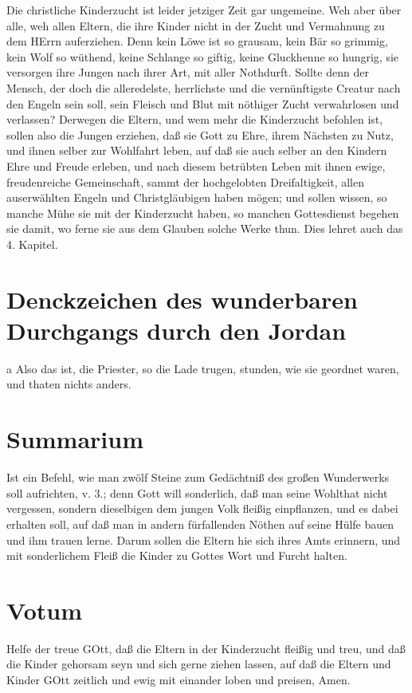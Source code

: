 Die christliche Kinderzucht ist leider jetziger Zeit gar ungemeine. Weh aber über alle, weh allen Eltern, die ihre Kinder nicht in der Zucht und Vermahnung zu dem HErrn auferziehen. Denn kein Löwe ist so grausam, kein Bär so grimmig, kein Wolf so wüthend, keine Schlange so giftig, keine Gluckhenne so hungrig, sie versorgen ihre Jungen nach ihrer Art, mit aller Nothdurft. Sollte denn der Mensch, der doch die alleredelste, herrlichste und die vernünftigste Creatur nach den Engeln sein soll, sein Fleisch und Blut mit nöthiger Zucht verwahrlosen und verlassen? Derwegen die Eltern, und wem mehr die Kinderzucht befohlen ist, sollen also die Jungen erziehen, daß sie Gott zu Ehre, ihrem Nächsten zu Nutz, und ihnen selber zur Wohlfahrt leben, auf daß sie auch selber an den Kindern Ehre und Freude erleben, und nach diesem betrübten Leben mit ihnen ewige, freudenreiche Gemeinschaft, sammt der hochgelobten Dreifaltigkeit, allen auserwählten Engeln und Christgläubigen haben mögen; und sollen wissen, so manche Mühe sie mit der Kinderzucht haben, so manchen Gottesdienst begehen sie damit, wo ferne sie aus dem Glauben solche Werke thun. Dies lehret auch das 4. Kapitel.

\section{Denckzeichen des wunderbaren Durchgangs durch den Jordan}

a Also das ist, die Priester, so die Lade trugen, stunden, wie sie geordnet waren, und thaten nichts anders.
\section{Summarium}

Ist ein Befehl, wie man zwölf Steine zum Gedächtniß des großen Wunderwerks soll aufrichten, v. 3.; denn Gott will sonderlich, daß man seine Wohlthat nicht vergessen, sondern dieselbigen dem jungen Volk fleißig einpflanzen, und es dabei erhalten soll, auf daß man in andern fürfallenden Nöthen auf seine Hülfe bauen und ihm trauen lerne. Darum sollen die Eltern hie sich ihres Amts erinnern, und mit sonderlichem Fleiß die Kinder zu Gottes Wort und Furcht halten.

\section{Votum}

Helfe der treue GOtt, daß die Eltern in der Kinderzucht fleißig und treu, und daß die Kinder gehorsam seyn und sich gerne ziehen lassen, auf daß die Eltern und Kinder GOtt zeitlich und ewig mit einander loben und preisen, Amen.

